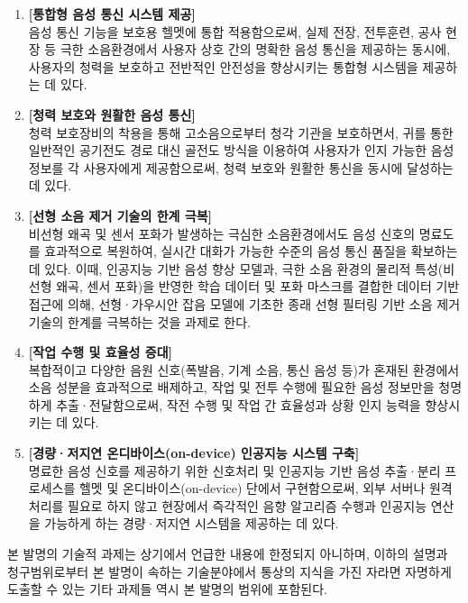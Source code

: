 \documentclass{article}
\begin{document}
\begin{enumerate}[label=(\alph*)]
    \item \textbf{[통합형 음성 통신 시스템 제공]}\\
    음성 통신 기능을 보호용 헬멧에 통합 적용함으로써, 실제 전장, 전투훈련, 공사 현장 등 극한 소음환경에서 사용자 상호 간의 명확한 음성 통신을 제공하는 동시에, 사용자의 청력을 보호하고 전반적인 안전성을 향상시키는 통합형 시스템을 제공하는 데 있다.

    \item \textbf{[청력 보호와 원활한 음성 통신]}\\
    청력 보호장비의 착용을 통해 고소음으로부터 청각 기관을 보호하면서, 귀를 통한 일반적인 공기전도 경로 대신 골전도 방식을 이용하여 사용자가 인지 가능한 음성 정보를 각 사용자에게 제공함으로써, 청력 보호와 원활한 통신을 동시에 달성하는 데 있다.
    
    \item \textbf{[선형 소음 제거 기술의 한계 극복]}\\
    비선형 왜곡 및 센서 포화가 발생하는 극심한 소음환경에서도 음성 신호의 명료도를 효과적으로 복원하여, 실시간 대화가 가능한 수준의 음성 통신 품질을 확보하는 데 있다. 이때, 인공지능 기반 음성 향상 모델과, 극한 소음 환경의 물리적 특성(비선형 왜곡, 센서 포화)을 반영한 학습 데이터 및 포화 마스크를 결합한 데이터 기반 접근에 의해, 선형·가우시안 잡음 모델에 기초한 종래 선형 필터링 기반 소음 제거 기술의 한계를 극복하는 것을 과제로 한다.

    \item \textbf{[작업 수행 및 효율성 증대]}\\
    복합적이고 다양한 음원 신호(폭발음, 기계 소음, 통신 음성 등)가 혼재된 환경에서 소음 성분을 효과적으로 배제하고, 작업 및 전투 수행에 필요한 음성 정보만을 청명하게 추출·전달함으로써, 작전 수행 및 작업 간 효율성과 상황 인지 능력을 향상시키는 데 있다.

    \item \textbf{[경량·저지연 온디바이스(on-device) 인공지능 시스템 구축]}\\
    명료한 음성 신호를 제공하기 위한 신호처리 및 인공지능 기반 음성 추출·분리 프로세스를 헬멧 및 온디바이스(on-device) 단에서 구현함으로써, 외부 서버나 원격 처리를 필요로 하지 않고 현장에서 즉각적인 음향 알고리즘 수행과 인공지능 연산을 가능하게 하는 경량·저지연 시스템을 제공하는 데 있다.
\end{enumerate}

본 발명의 기술적 과제는 상기에서 언급한 내용에 한정되지 아니하며, 이하의 설명과 청구범위로부터 본 발명이 속하는 기술분야에서 통상의 지식을 가진 자라면 자명하게 도출할 수 있는 기타 과제들 역시 본 발명의 범위에 포함된다.
\end{document}
